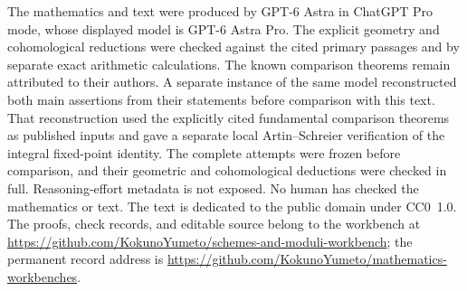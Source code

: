 \documentclass[11pt]{article}
\newcommand{\workbenchurl}{https://github.com/KokunoYumeto/schemes-and-moduli-workbench}
\newcommand{\recordurl}{https://github.com/KokunoYumeto/mathematics-workbenches}
\theoremstyle{definition}\newtheorem{definition}[theorem]{Definition}
\theoremstyle{remark}\newtheorem{remark}[theorem]{Remark}
\begin{document}
The mathematics and text were produced by GPT-6 Astra in ChatGPT Pro mode, whose displayed model is GPT-6 Astra Pro. The explicit geometry and cohomological reductions were checked against the cited primary passages and by separate exact arithmetic calculations. The known comparison theorems remain attributed to their authors. A separate instance of the same model reconstructed both main assertions from their statements before comparison with this text. That reconstruction used the explicitly cited fundamental comparison theorems as published inputs and gave a separate local Artin--Schreier verification of the integral fixed-point identity. The complete attempts were frozen before comparison, and their geometric and cohomological deductions were checked in full. Reasoning-effort metadata is not exposed. No human has checked the mathematics or text. The text is dedicated to the public domain under CC0~1.0. The proofs, check records, and editable source belong to the workbench at \url{\workbenchurl}; the permanent record address is \url{\recordurl}.
\end{document}
